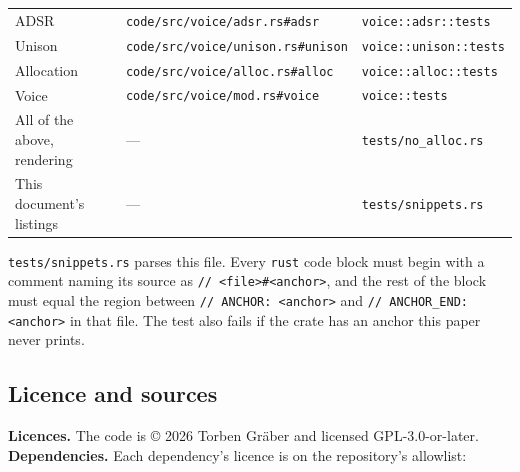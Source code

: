 \documentclass[conference]{IEEEtran}
\begin{document}
\begin{table}[t]
\begin{tabularx}{\textwidth}{@{}>{\raggedright\arraybackslash}X>{\raggedright\arraybackslash}X>{\raggedright\arraybackslash}X@{}}
ADSR & \texttt{code/\allowbreak{}src/\allowbreak{}voice/\allowbreak{}adsr.\allowbreak{}rs\#\allowbreak{}adsr} & \texttt{voice::\allowbreak{}adsr::\allowbreak{}tests} \\
Unison & \texttt{code/\allowbreak{}src/\allowbreak{}voice/\allowbreak{}unison.\allowbreak{}rs\#\allowbreak{}unison} & \texttt{voice::\allowbreak{}unison::\allowbreak{}tests} \\
Allocation & \texttt{code/\allowbreak{}src/\allowbreak{}voice/\allowbreak{}alloc.\allowbreak{}rs\#\allowbreak{}alloc} & \texttt{voice::\allowbreak{}alloc::\allowbreak{}tests} \\
Voice & \texttt{code/\allowbreak{}src/\allowbreak{}voice/\allowbreak{}mod.\allowbreak{}rs\#\allowbreak{}voice} & \texttt{voice::\allowbreak{}tests} \\
All of the above, rendering & — & \texttt{tests/\allowbreak{}no\_\allowbreak{}alloc.\allowbreak{}rs} \\
This document's listings & — & \texttt{tests/\allowbreak{}snippets.\allowbreak{}rs} \\
\bottomrule
\end{tabularx}
\end{table}

\texttt{tests/\allowbreak{}snippets.\allowbreak{}rs} parses this file. Every \texttt{rust} code block must begin with a comment naming its source as \texttt{/\allowbreak{}/\allowbreak{} <file>\#\allowbreak{}<anchor>}, and the rest of the block must equal the region between \texttt{/\allowbreak{}/\allowbreak{} ANCHOR: <anchor>} and \texttt{/\allowbreak{}/\allowbreak{} ANCHOR\_\allowbreak{}END: <anchor>} in that file. The test also fails if the crate has an anchor this paper never prints.

\setcounter{subsection}{6}
\subsection{Licence and sources}
\textbf{Licences.} The code is © 2026 Torben Gräber and licensed GPL-3.0-or-later. \textbf{Dependencies.} Each dependency's licence is on the repository's allowlist:
\end{document}
